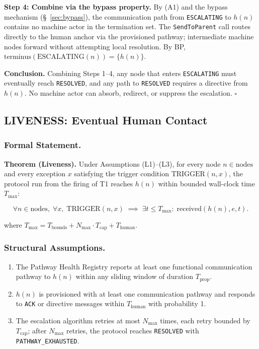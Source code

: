 \medskip
\noindent\textbf{Step 4: Combine via the bypass property.} By (A1) and the bypass mechanism (\S~\ref{sec:bypass}), the communication path from \texttt{ESCALATING} to $h(n)$ contains no machine actor in the termination set. The \texttt{SendToParent} call routes directly to the human anchor via the provisioned pathway; intermediate machine nodes forward without attempting local resolution. By BP, $\text{terminus}(\text{ESCALATING}(n)) = \{h(n)\}$.

\medskip
\noindent\textbf{Conclusion.} Combining Steps 1--4, any node that enters \texttt{ESCALATING} must eventually reach \texttt{RESOLVED}, and any path to \texttt{RESOLVED} requires a directive from $h(n)$. No machine actor can absorb, redirect, or suppress the escalation. $\square$

\subsection{LIVENESS: Eventual Human Contact}

\subsubsection{Formal Statement.}

\begin{bluebox}
\textbf{Theorem (Liveness).} Under Assumptions (L1)--(L3), for every node $n \in \text{nodes}$ and every exception $x$ satisfying the trigger condition $\text{TRIGGER}(n, x)$, the protocol run from the firing of T1 reaches $h(n)$ within bounded wall-clock time $T_{\max}$:

\[
\forall n \in \text{nodes},\; \forall x,\; \text{TRIGGER}(n, x) \;\implies\; \exists t \leq T_{\max}:\; \text{received}(h(n), e, t).
\tag{LIVENESS}
\]

where $T_{\max} = T_{\text{bounds}} + N_{\max} \cdot T_{\text{cap}} + T_{\text{human}}$.
\end{bluebox}

\subsubsection{Structural Assumptions.}

\begin{enumerate}
\item[(L1)] The Pathway Health Registry reports at least one functional communication pathway to $h(n)$ within any sliding window of duration $T_{\text{prop}}$.
\item[(L2)] $h(n)$ is provisioned with at least one communication pathway and responds to \texttt{ACK} or directive messages within $T_{\text{human}}$ with probability 1.
\item[(L3)] The escalation algorithm retries at most $N_{\max}$ times, each retry bounded by $T_{\text{cap}}$; after $N_{\max}$ retries, the protocol reaches \texttt{RESOLVED} with \texttt{PATHWAY\_EXHAUSTED}.
\end{enumerate}

